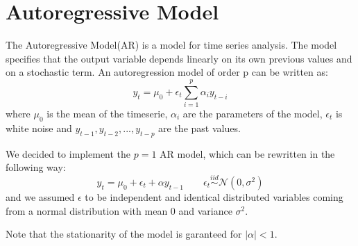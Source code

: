 \section{Autoregressive Model}
\label{sec:AR}
The Autoregressive Model(AR) is a model for time series analysis. The model specifies that the output variable depends 
linearly on its own previous values and on a stochastic term. An autoregression model of order p can be written as:
\begin{equation}
    y_{t}=\mu_{0}+\epsilon_t \sum^{p}_{i=1}\alpha_{i} y_{t-i}
\end{equation}
where $\mu_{0}$ is the mean of the timeserie, $\alpha_{i}$ are the parameters of the model, $\epsilon_{t}$ is white noise and $y_{t-1}, y_{t-2}, ..., y_{t-p}$ are the past values.

We decided to implement the $p=1$ AR model, which can be rewritten in the following way:
\begin{equation}
    \label{AR_q1}
    y_{t}=\mu_{0}+\epsilon_t +\alpha y_{t-1} \qquad 
    \epsilon_t \stackrel{iid}{\sim} \mathcal{N}(0,\sigma^2)
\end{equation}
and we assumed $\epsilon$ to be independent and identical distributed variables coming from a normal distribution with mean $0$ and variance $\sigma^2$.

Note that the stationarity of the model is garanteed for $|\alpha|<1$.


